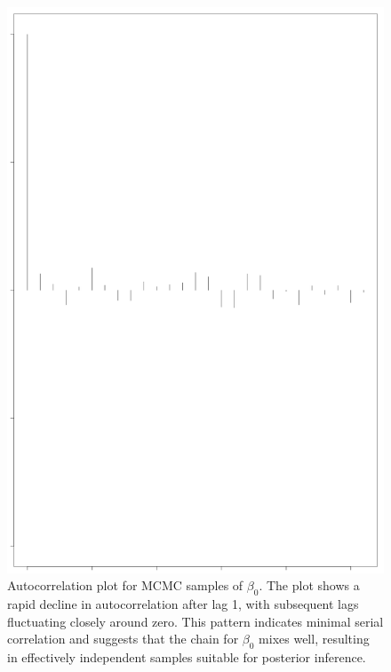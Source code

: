 \documentclass[]{article}
\begin{document}
\begin{figure}[H]
	\centering
	\includegraphics[width=0.7\linewidth]{img/img-autocorr-beta0}
	\caption{Autocorrelation plot for MCMC samples of $\beta_0$. The plot shows a rapid decline in autocorrelation after lag 1, with subsequent lags fluctuating closely around zero. This pattern indicates  minimal serial correlation and suggests that the chain for $\beta_0$ mixes well, resulting in effectively independent samples suitable for posterior inference.}
	\label{fig:img-autocorr-beta0}
\end{figure}
\end{document}
